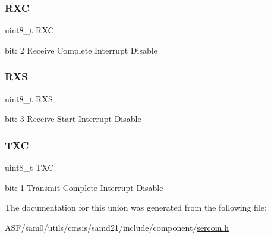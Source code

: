 \subsubsection{\texorpdfstring{RXC}{RXC}}
{\footnotesize\ttfamily uint8\+\_\+t R\+XC}

bit\+: 2 Receive Complete Interrupt Disable \mbox{\label{union_s_e_r_c_o_m___u_s_a_r_t___i_n_t_e_n_c_l_r___type_ab54b6e9387289f3bbffba2ad5b5fd646}} 
\subsubsection{\texorpdfstring{RXS}{RXS}}
{\footnotesize\ttfamily uint8\+\_\+t R\+XS}

bit\+: 3 Receive Start Interrupt Disable \mbox{\label{union_s_e_r_c_o_m___u_s_a_r_t___i_n_t_e_n_c_l_r___type_a8f012b40a2f5cf52b14d448b314b5cec}} 
\subsubsection{\texorpdfstring{TXC}{TXC}}
{\footnotesize\ttfamily uint8\+\_\+t T\+XC}

bit\+: 1 Transmit Complete Interrupt Disable 

The documentation for this union was generated from the following file\+:\begin{DoxyCompactItemize}
\item 
A\+S\+F/sam0/utils/cmsis/samd21/include/component/\mbox{\hyperlink{utils_2cmsis_2samd21_2include_2component_2sercom_8h}{sercom.\+h}}\end{DoxyCompactItemize}
